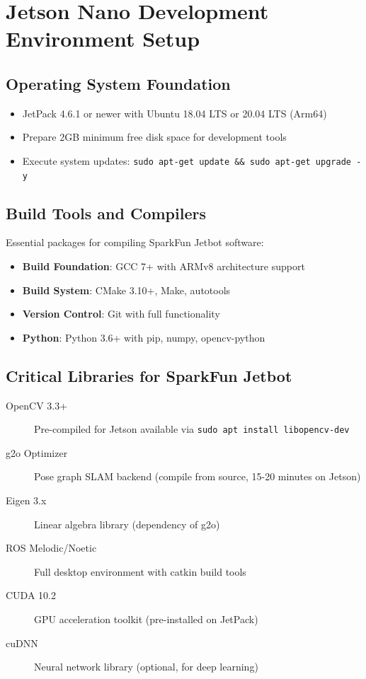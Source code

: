 \section{Jetson Nano Development Environment Setup}

\subsection{Operating System Foundation}

\begin{itemize}
    \item JetPack 4.6.1 or newer with Ubuntu 18.04 LTS or 20.04 LTS (Arm64)
    \item Prepare 2GB minimum free disk space for development tools
    \item Execute system updates: \texttt{sudo apt-get update \&\& sudo apt-get upgrade -y}
\end{itemize}

\subsection{Build Tools and Compilers}

Essential packages for compiling SparkFun Jetbot software:

\begin{itemize}
    \item \textbf{Build Foundation}: GCC 7+ with ARMv8 architecture support
    \item \textbf{Build System}: CMake 3.10+, Make, autotools
    \item \textbf{Version Control}: Git with full functionality
    \item \textbf{Python}: Python 3.6+ with pip, numpy, opencv-python
\end{itemize}

\subsection{Critical Libraries for SparkFun Jetbot}

\begin{description}
    \item[OpenCV 3.3+] Pre-compiled for Jetson available via \texttt{sudo apt install libopencv-dev}
    \item[g2o Optimizer] Pose graph SLAM backend (compile from source, 15-20 minutes on Jetson)
    \item[Eigen 3.x] Linear algebra library (dependency of g2o)
    \item[ROS Melodic/Noetic] Full desktop environment with catkin build tools
    \item[CUDA 10.2] GPU acceleration toolkit (pre-installed on JetPack)
    \item[cuDNN] Neural network library (optional, for deep learning)
\end{description}

